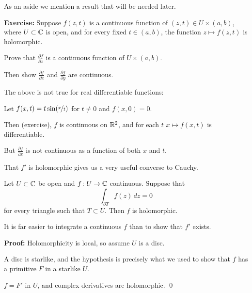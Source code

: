 \documentclass[10pt,aspectratio=169]{beamer}
\begin{document}
\begin{frame}

As an aside we mention a result that will be needed later.

\medskip
\pause

\textbf{Exercise:}
Suppose $f(z,t)$ is a continuous function of $(z,t) \in U \times (a,b)$,
where $U \subset {\mathbb{C}}$ is open, and for every fixed $t \in (a,b)$, the function
$z \mapsto f(z,t)$ is holomorphic.

\pause

Prove that
$\frac{\partial f}{\partial z}$ is a continuous function of $U \times
(a,b)$.

\pause

Then show
$\frac{\partial f}{\partial x}$
and
$\frac{\partial f}{\partial y}$ are continuous.

\medskip
\pause

The above is not true for real differentiable functions:

\medskip
\pause

Let $f(x,t) = t \sin(\nicefrac{x}{t})$ for $t \not= 0$ and $f(x,0) =  0$.

\medskip
\pause

Then (exercise), $f$ is continuous on ${\mathbb{R}}^2$, and for each $t$
$x \mapsto f(x,t)$ is differentiable.

\medskip
\pause

But $\frac{\partial f}{\partial x}$ is not continuous as a function of both
$x$ and $t$.
\end{frame}

\begin{frame}
That $f'$ is holomorphic gives us a very useful converse to Cauchy.

\pause

\begin{theorem}[Morera]
Let $U \subset {\mathbb{C}}$ be open and $f \colon U \to {\mathbb{C}}$ continuous.
Suppose that
\[
\int_{\partial T} f(z) \, dz = 0
\]
for every triangle such that $T \subset U$.
\pause
Then $f$ is holomorphic.
\end{theorem}

\pause

It is far easier to integrate a continuous $f$ than to show that $f'$ exists.

\medskip
\pause

\textbf{Proof:}
Holomorphicity is local, so assume $U$ is a disc.

\medskip
\pause

A disc is starlike, and the hypothesis is precisely what we used
to show that $f$ has a primitive $F$ in a starlike $U$.

\medskip
\pause

$f = F'$ in $U$, and complex derivatives are holomorphic.
\qed

\end{frame}
\end{document}

